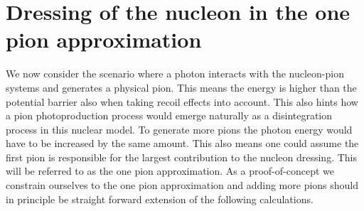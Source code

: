 \section{Dressing of the nucleon in the one pion approximation}
We now consider the scenario where a photon interacts with the nucleon-pion systems and generates a physical pion. This means the energy is higher than the potential barrier also when taking recoil effects into account. This also hints how a pion photoproduction process would emerge naturally as a disintegration process in this nuclear model. To generate more pions the photon energy would have to be increased by the same amount. This also means one could assume the first pion is responsible for the largest contribution to the nucleon dressing.  This will be referred to as the one pion approximation.  As a proof-of-concept we constrain ourselves to the one pion approximation and adding more pions should in principle be straight forward extension of the following calculations.


